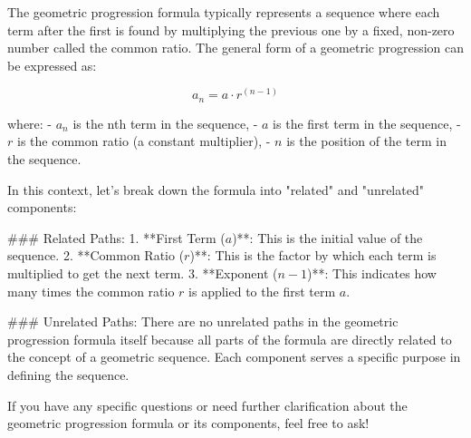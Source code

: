 The geometric progression formula typically represents a sequence where each term after the first is found by multiplying the previous one by a fixed, non-zero number called the common ratio. The general form of a geometric progression can be expressed as:

\[ a_n = a \cdot r^{(n-1)} \]

where:
- \( a_n \) is the nth term in the sequence,
- \( a \) is the first term in the sequence,
- \( r \) is the common ratio (a constant multiplier),
- \( n \) is the position of the term in the sequence.

In this context, let's break down the formula into "related" and "unrelated" components:

### Related Paths:
1. **First Term (\( a \))**: This is the initial value of the sequence.
2. **Common Ratio (\( r \))**: This is the factor by which each term is multiplied to get the next term.
3. **Exponent (\( n-1 \))**: This indicates how many times the common ratio \( r \) is applied to the first term \( a \).

### Unrelated Paths:
There are no unrelated paths in the geometric progression formula itself because all parts of the formula are directly related to the concept of a geometric sequence. Each component serves a specific purpose in defining the sequence.

If you have any specific questions or need further clarification about the geometric progression formula or its components, feel free to ask!